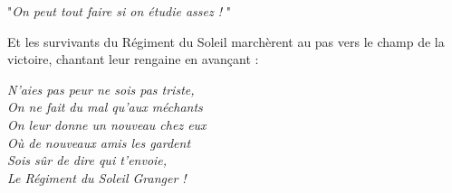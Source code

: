 "\emph{On peut tout faire si on étudie assez !} "

Et les survivants du Régiment du Soleil marchèrent au pas vers le champ de la victoire, chantant leur rengaine en avançant :

\emph{N'aies pas peur ne sois pas triste,} \\\emph{} \emph{On ne fait du mal qu'aux méchants} \\\emph{} \emph{On leur donne un nouveau chez eux} \\\emph{} \emph{Où de nouveaux amis les gardent} \\\emph{} \emph{Sois sûr de dire qui t'envoie,} \\\emph{} \emph{Le Régiment du Soleil Granger !} 

